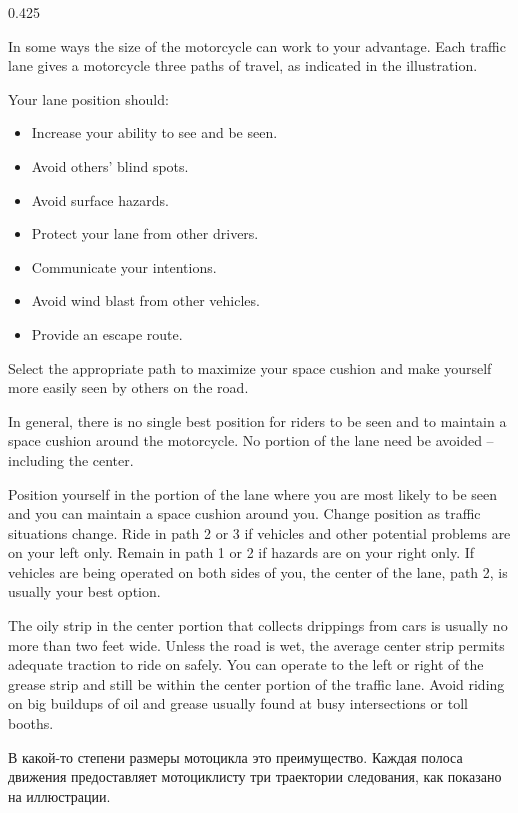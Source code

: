 \begin{langblock}{0.425}
	\begin{eng}
	In some ways the size of the motorcycle can work to your advantage. Each traffic lane gives a motorcycle three paths of travel, as indicated in the illustration.
	
	Your lane position should:
	\begin{itemize}[noitemsep]
		\item  Increase your ability to see and be
		seen.
		\item Avoid others' blind spots.
		\item Avoid surface hazards.
		\item Protect your lane from other
		drivers.
		\item Communicate your intentions.
		\item Avoid wind blast from other vehicles.
		\item Provide an escape route.
	\end{itemize}
	
	Select the appropriate path to maximize your space cushion and make yourself more easily seen by others on the road.
	
	In general, there is no single best position for riders to be seen and to maintain a space cushion around the motorcycle. No portion of the lane need be avoided -- including the center.
	
	Position yourself in the portion of the lane where you are most likely to be seen and you can maintain a space cushion around you. Change position as traffic situations change. Ride in path 2 or 3 if vehicles and other potential problems are on your left only. Remain in path 1 or 2 if hazards are on your right only. If vehicles are being operated on both sides of you, the center of the lane, path 2, is usually your best option.
	
	The oily strip in the center portion that collects drippings from cars is usually no more than two feet wide. Unless the road is wet, the average center strip permits adequate traction to ride on safely. You can operate to the left or right of the grease strip and still be within the center portion of the traffic lane. Avoid riding on big buildups of oil and grease usually found at busy intersections or toll booths.
	\end{eng}
	\begin{rus}
		В какой-то степени размеры мотоцикла это преимущество. Каждая полоса движения предоставляет мотоциклисту три траектории следования, как показано на иллюстрации.
		

\end{rus}
\end{langblock}
